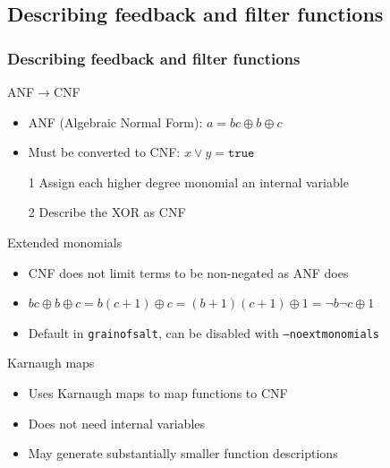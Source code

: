 \documentclass[xcolor=usenames,xcolor=svgnames,table,slidestop,compress,mathserif]{beamer}
\begin{document}
\subsection{Describing feedback and filter functions}
\frame
{\frametitle{Describing feedback and filter functions}
\begin{beamerboxesrounded}[shadow=true]{ANF$\rightarrow$CNF}
\begin{itemize}
 \item ANF (Algebraic Normal Form): $a = bc \oplus b \oplus c$
 \item Must be converted to CNF: $x \vee y = \texttt{true}$
 \item[1] Assign each higher degree monomial an internal variable
 \item[2] Describe the XOR as CNF
\end{itemize}
\end{beamerboxesrounded}

\begin{beamerboxesrounded}[shadow=true]{Extended monomials}
\begin{itemize}
 \item CNF does not limit terms to be non-negated as ANF does
 \item $bc\oplus b \oplus c= b(c+1) \oplus c= (b+1)(c+1)\oplus 1 = \neg b \neg c \oplus 1$
 \item Default in \texttt{grainofsalt}, can be disabled with \texttt{--noextmonomials}
\end{itemize}
\end{beamerboxesrounded}

\begin{beamerboxesrounded}[shadow=true]{Karnaugh maps}
\begin{itemize}
 \item Uses Karnaugh maps to map functions to CNF
 \item Does not need internal variables
 \item May generate substantially smaller function descriptions
\end{itemize}

\end{beamerboxesrounded}

}
\end{document}
